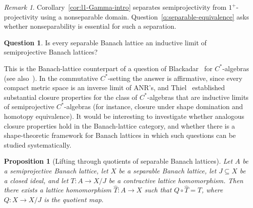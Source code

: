 \documentclass[11pt]{amsart}
\numberwithin{equation}{section}
\newtheorem{proposition}[theorem]{Proposition}
\theoremstyle{definition}
\newtheorem{question}[theorem]{Question}
\theoremstyle{remark}
\newtheorem{remark}[theorem]{Remark}
\theoremstyle{plain}
\begin{document}
\begin{remark}
Corollary~\ref{cor:l1-Gamma-intro} separates semiprojectivity from $1^+$-projectivity using a nonseparable domain.
Question~\ref{q:separable-equivalence} asks whether nonseparability is essential for such a separation.
\end{remark}

\begin{question}\label{q:inductive-limit}
Is every separable Banach lattice an inductive limit of semiprojective Banach lattices?
\end{question}

This is the Banach-lattice counterpart of a question of
Blackadar~\cite[Section~4]{blackadar85} for $C^*$-algebras
(see also~\cite{thiel-inductive}).
In the commutative $C^*$-setting the answer is affirmative, since every compact metric space
is an inverse limit of ANR's,
and Thiel~\cite{thiel-inductive} established substantial closure properties
for the class of $C^*$-algebras that are inductive limits of semiprojective
$C^*$-algebras (for instance, closure under shape domination and homotopy equivalence).
It would be interesting to investigate whether analogous closure properties
hold in the Banach-lattice category,
and whether there is a shape-theoretic framework for Banach lattices
in which such questions can be studied systematically.

\begin{proposition}[Lifting through quotients of separable Banach lattices]\label{prop:sep-quotient-lift}
Let $A$ be a semiprojective Banach lattice, let $X$ be a separable Banach lattice,
let $J\subseteq X$ be a closed ideal, and let
$T\colon A\to X/J$ be a contractive lattice homomorphism.
Then there exists a lattice homomorphism $\widehat T\colon A\to X$ such that
$Q\circ \widehat T=T$, where $Q\colon X\to X/J$ is the quotient map.
\end{proposition}
\end{document}
